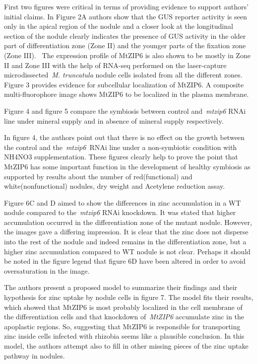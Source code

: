 \documentclass[10pt]{article}
\begin{document}
\par\null

First two figures were critical in terms of providing evidence to
support authors' initial claims. In Figure 2A authors show that the GUS
reporter activity is seen only in the apical region of the nodule and a
closer look at the longitudinal section of the nodule clearly indicates
the presence of GUS activity in the older part of differentiation zone
(Zone II) and the younger parts of the fixation zone (Zone III).~ The
expression profile of MtZIP6 is also shown to be mostly in Zone II and
Zone III with the help of RNA-seq performed on the laser-capture
microdissected~\emph{M. truncatula} nodule cells isolated from all the
different zones. Figure 3 provides evidence for subcellular localization
of MtZIP6. A composite multi-fluorophore image shows MtZIP6 to be
localized in the plasma membrane.~

Figure 4 and figure 5 compare the symbiosis between control
and~\emph{mtzip6} RNAi line under mineral supply and in absence of
mineral supply respectively.

In figure 4, the authors point out that there is no effect on the growth
between the control and the~\emph{mtzip6~}RNAi line under a
non-symbiotic condition with NH4NO3 supplementation. These figures
clearly help to prove the point that MtZIP6 has some important function
in the development of healthy symbiosis as supported by results about
the number of red(functional) and white(nonfunctional) nodules, dry
weight and Acetylene reduction assay.

\par\null

Figure 6C and D aimed to show the differences in zinc accumulation in a
WT nodule compared to the~\emph{mtzip6} RNAi knockdown. It was stated
that higher accumulation occurred in the differentiation zone of the
mutant nodule. However, the images gave a differing impression. It is
clear that the zinc does not disperse into the rest of the nodule and
indeed remains in the differentiation zone, but a higher zinc
accumulation compared to WT nodule is not clear. Perhaps it should be
noted in the figure legend that figure 6D have been altered in order to
avoid oversaturation in the image. ~~

\par\null

The authors present a proposed model to summarize their findings and
their hypothesis for zinc uptake by nodule cells in figure 7. The model
fits their results, which showed that MtZIP6 is most probably localized
in the cell membrane of the differentiation cells and that knockdown
of~\emph{MtZIP6} accumulate zinc in the apoplastic regions. So,
suggesting that MtZIP6 is responsible for transporting zinc inside cells
infected with rhizobia seems like a plausible conclusion. In this model,
the authors attempt also to fill in other missing pieces of the zinc
uptake pathway in nodules.~
\end{document}
